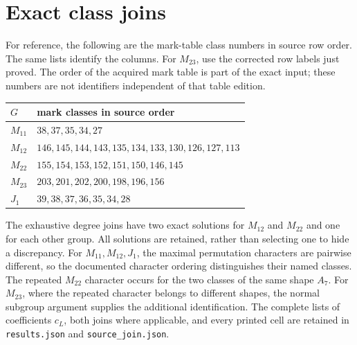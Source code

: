 \documentclass[11pt]{article}
\begin{document}
\section{Exact class joins}
For reference, the following are the mark-table class numbers in source
row order. The same lists identify the columns. For $M_{23}$, use the
corrected row labels just proved. The order of the acquired mark table is
part of the exact input; these numbers are not identifiers independent of
that table edition.
\begin{center}\small
\begin{tabular}{ll}
\toprule
$G$ & mark classes in source order\\
\midrule
$M_{11}$ & $38,37,35,34,27$\\
$M_{12}$ & $146,145,144,143,135,134,133,130,126,127,113$\\
$M_{22}$ & $155,154,153,152,151,150,146,145$\\
$M_{23}$ & $203,201,202,200,198,196,156$\\
$J_1$ & $39,38,37,36,35,34,28$\\
\bottomrule
\end{tabular}
\end{center}
The exhaustive degree joins have two exact solutions for $M_{12}$ and
$M_{22}$ and one for each other group. All solutions are retained, rather
than selecting one to hide a discrepancy. For $M_{11},M_{12},J_1$, the
maximal permutation characters are pairwise different, so the documented
character ordering distinguishes their named classes. The repeated
$M_{22}$ character occurs for the two classes of the same shape $A_7$.
For $M_{23}$, where the repeated character belongs to different shapes,
the normal subgroup argument supplies the additional identification.
The complete lists of coefficients $c_L$, both joins where applicable,
and every printed cell are retained in \texttt{results.json} and
\texttt{source\_join.json}.
\end{document}
